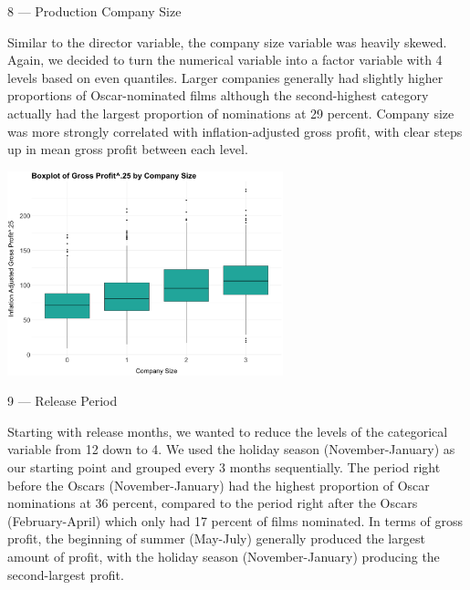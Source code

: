 \documentclass[10pt]{article}
\begin{document}
8 --- Production Company Size

Similar to the director variable, the company size variable was heavily skewed. Again, we decided to turn the numerical variable into a factor variable with 4 levels based on even quantiles. Larger companies generally had slightly higher proportions of Oscar-nominated films although the second-highest category actually had the largest proportion of nominations at 29 percent. Company size was more strongly correlated with inflation-adjusted gross profit, with clear steps up in mean gross profit between each level. 

\begin{center}
\includegraphics[width=8cm]{_assets/_eda/co_size_iagp_bp.png}

\end{center}

9 --- Release Period

Starting with release months, we wanted to reduce the levels of the categorical variable from 12 down to 4. We used the holiday season (November-January) as our starting point and grouped every 3 months sequentially. The period right before the Oscars (November-January) had the highest proportion of Oscar nominations at 36 percent, compared to the period right after the Oscars (February-April) which only had 17 percent of films nominated. In terms of gross profit, the beginning of summer (May-July) generally produced the largest amount of profit, with the holiday season (November-January) producing the second-largest profit. 
\end{document}
